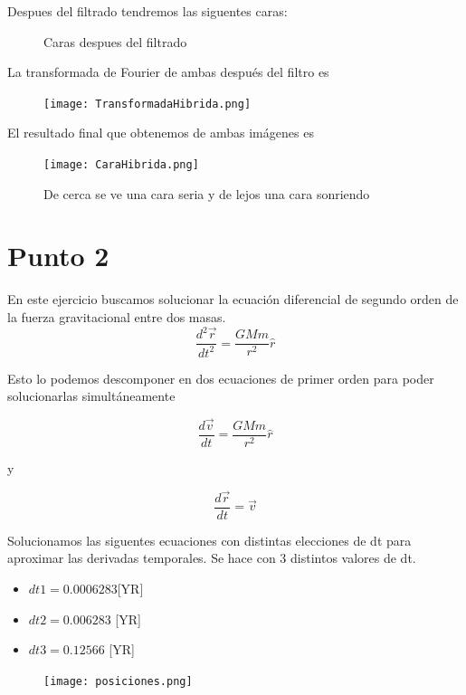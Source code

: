 \documentclass{article}
\begin{document}
Despues del filtrado tendremos las siguentes caras:
\begin{figure}[!htbp]
  \centering
  \hspace{0.05cm}
  \caption{Caras despues del filtrado}
\end{figure}


La transformada de Fourier de ambas despu\'es del filtro es
\begin{figure}[!htbp]
 \centering
  \texttt{[image: TransformadaHibrida.png]}
\end{figure}

El resultado final que obtenemos de ambas im\'agenes es

\begin{figure}[!htbp]
 \centering
  \texttt{[image: CaraHibrida.png]}
  \caption{De cerca se ve una cara seria y de lejos una cara sonriendo}
\end{figure}

\pagebreak

\section*{Punto 2}

En este ejercicio buscamos solucionar la ecuaci\'on diferencial de segundo orden de la fuerza gravitacional entre dos masas.
\begin{equation*}
    \frac{d^2 \Vec{r}}{dt^2} = \frac{GMm }{r^2} \hat{r}
\end{equation*}

Esto lo podemos descomponer en dos ecuaciones de primer orden para poder solucionarlas simult\'aneamente

\begin{equation*}
    \frac{d \Vec{v}}{dt} = \frac{GMm }{r^2} \hat{r}
\end{equation*}

y

\begin{equation*}
    \frac{d\Vec{r}}{dt} = \Vec{v}
\end{equation*}

Solucionamos las siguentes ecuaciones con distintas elecciones de dt para aproximar las derivadas temporales. Se hace con 3 distintos valores de dt. 
\begin{itemize}
    \item $dt1=0.0006283 $[YR]
    \item $dt2 = 0.006283$ [YR]
    \item $dt3 = 0.12566$ [YR]
\end{itemize}
\begin{figure}[!htbp]
 \centering
  \texttt{[image: posiciones.png]}
\end{figure}
\end{document}
